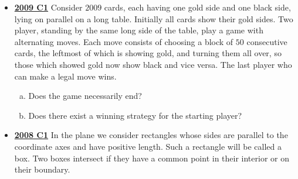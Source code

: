 \documentclass[11pt]{scrartcl}
\begin{document}
\begin{itemize}[leftmargin=*]
    Can it happen that there are exactly $2010$ orders of the singers such that all their wishes are satisfied?
    \item \href{https://artofproblemsolving.com/community/c6h355783p1932923}{\textbf{2009 C1}} Consider $2009$ cards, each having one gold side and one black side, lying on parallel on a long table. Initially all cards show their gold sides. Two player, standing by the same long side of the table, play a game with alternating moves. Each move consists of choosing a block of $50$ consecutive cards, the leftmost of which is showing gold, and turning them all over, so those which showed gold now show black and vice versa. The last player who can make a legal move wins. 
    \begin{enumerate}[(a)]
        \item Does the game necessarily end?
        \item Does there exist a winning strategy for the starting player?
    \end{enumerate}
    \item \href{https://artofproblemsolving.com/community/c6h287859p1555905}{\textbf{2008 C1}} 	In the plane we consider rectangles whose sides are parallel to the coordinate axes and have positive length. Such a rectangle will be called a box. Two boxes intersect if they have a common point in their interior or on their boundary. 
    

\end{itemize}
\end{document}
